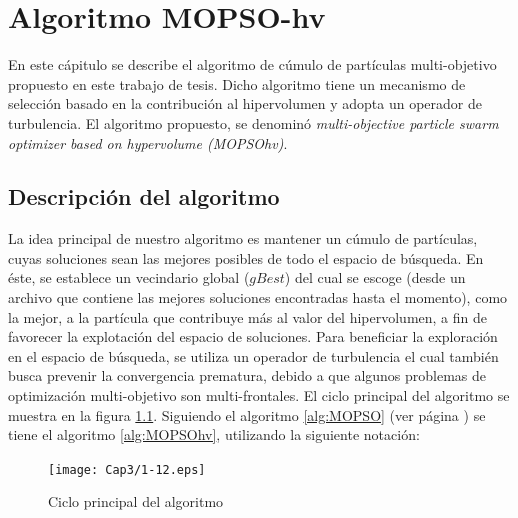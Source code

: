 \chapter{Algoritmo MOPSO-hv}

  En este c\'apitulo se describe el algoritmo de c\'umulo de part\'iculas multi-objetivo propuesto en este trabajo 
  de tesis. Dicho algoritmo tiene un mecanismo de selecci\'on basado en la contribuci\'on al hipervolumen y adopta un operador de turbulencia.
  El algoritmo propuesto, se denomin\'o \textit{multi-objective particle swarm optimizer based on hypervolume (MOPSOhv)}. 
  
\section*{Descripci\'on del algoritmo}
 
 La idea principal de nuestro algoritmo es mantener un c\'umulo de part\'iculas, cuyas soluciones sean las mejores posibles de todo el 
 espacio de b\'usqueda. 
 En \'este, se establece un vecindario global ($gBest$) del cual se escoge (desde un archivo que contiene las mejores soluciones 
 encontradas hasta el momento), como la mejor, a la part\'icula que contribuye m\'as al valor del hipervolumen, a fin de favorecer la 
 explotaci\'on del espacio de soluciones. Para beneficiar la exploraci\'on en el espacio de b\'usqueda, se utiliza un operador de 
 turbulencia el cual tambi\'en busca prevenir la convergencia prematura, debido a que algunos problemas de optimizaci\'on multi-objetivo son 
 multi-frontales. El ciclo principal del algoritmo se muestra en la figura \ref{fig:mainalgo}. Siguiendo el algoritmo \ref{alg:MOPSO} 
 (ver p\'agina \pageref{alg:MOPSO}) se tiene el algoritmo \ref{alg:MOPSOhv}, utilizando la siguiente notaci\'on:

 \begin{figure}
 \begin{center}
    \texttt{[image: Cap3/1-12.eps]}
 \end{center}
  \caption{Ciclo principal del algoritmo}
\label{fig:mainalgo}
\end{figure}
 
